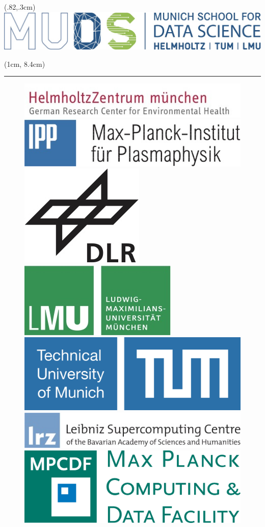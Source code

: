 \begin{frame}
\begin{textblock*}{\textwidth}(.82\textwidth,.3cm)
	\includegraphics[width=.32\textwidth]{./figure/logo/muds_logo.jpg}
\end{textblock*}
\begin{textblock*}{\textwidth}(1cm, 8.4cm)
	\begin{adjustwidth}{-1.75em}{-1.75em}
		\textcolor{MidnightBlue}{\noindent\rule{1.12\textwidth}{.5pt}}
		\begin{figure}
			\includegraphics[width=.22\textwidth]{./figure/logo/helmholtz_logo.jpg} 
			\includegraphics[width=.15\textwidth]{./figure/logo/ipp_logo.jpg} \hspace{0.001cm}
			\includegraphics[width=.06\textwidth]{./figure/logo/dlr_logo.jpg} \hspace{0.05cm}
			\includegraphics[width=.08\textwidth]{./figure/logo/lmu_logo.jpg} \hspace{0.001cm}
			\includegraphics[width=.1\textwidth]{./figure/logo/tum_logo.jpg} \hspace{0.05cm}
			\includegraphics[width=.2\textwidth]{./figure/logo/lrz_logo.jpg} \hspace{0.05cm}
			\includegraphics[width=.1\textwidth]{./figure/logo/mpcdf_logo.png}
	\end{figure}
	\end{adjustwidth}
\end{textblock*}
	\maketitle
\end{frame}